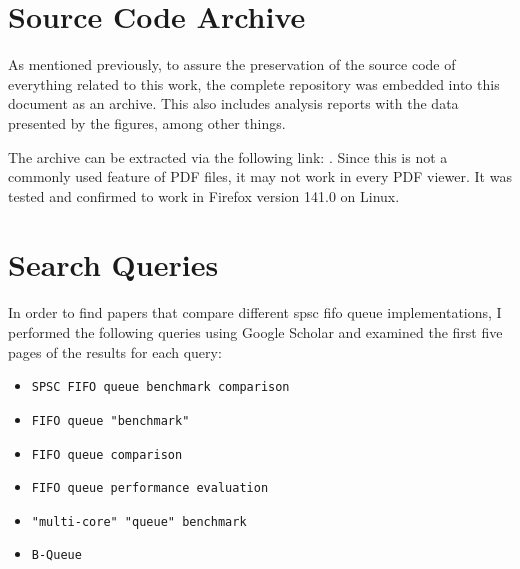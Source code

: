 \chapter{Source Code Archive}
\label{app:source-code-archive}
As mentioned previously, to assure the preservation of the source code of everything related to this work,
the complete repository was embedded into this document as an archive.
This also includes analysis reports with the data presented by the figures, among other things.

The archive can be extracted via the following link: .
Since this is not a commonly used feature of PDF files, it may not work in every PDF viewer.
It was tested and confirmed to work in Firefox version 141.0 on Linux.

\chapter{Search Queries}
\label{app:repro-search-queries}
In order to find papers that compare different \acrshort{spsc} \acrshort{fifo} queue implementations,
I performed the following queries using Google Scholar and examined the first five pages of the results for each query:
\begin{itemize}
    \item \texttt{SPSC FIFO queue benchmark comparison}
    \item \texttt{FIFO queue "benchmark"}
    \item \texttt{FIFO queue comparison}
    \item \texttt{FIFO queue performance evaluation}
    \item \texttt{"multi-core" "queue" benchmark}
    \item \texttt{B-Queue}
\end{itemize}

